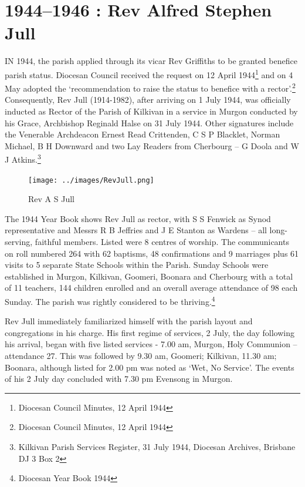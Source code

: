 \printendnotes[custom]
\setcounter{endnote}{0}
\chapter{1944--1946 : Rev Alfred Stephen Jull}
\nobalance


\lettrine[lines=3]{I}{N}
 1944, the parish applied through its vicar Rev Griffiths to be granted benefice parish status. Diocesan Council received the request on 12 April 1944\footnote{Diocesan Council Minutes, 12 April 1944} and on 4 May adopted the `recommendation to raise the status to benefice with a rector'.\footnote{Diocesan Council Minutes, 12 April 1944} Consequently, Rev Jull (1914-1982), after arriving on 1 July 1944, was officially inducted as Rector of the Parish of Kilkivan in a service in Murgon conducted by his Grace, Archbishop Reginald Halse on 31 July 1944. Other signatures include the Venerable Archdeacon Ernest Read Crittenden, C S P Blacklet, Norman Michael, B H Downward and two Lay Readers from Cherbourg -- G Doola and W J Atkins.\footnote{Kilkivan Parish Services Register, 31 July 1944, Diocesan Archives, Brisbane DJ 3 Box 2}







\begin{figure}
\begin{center}
\texttt{[image: ../images/RevJull.png]}
\caption{Rev A S Jull}
\end{center}
\end{figure}




The 1944 Year Book shows Rev Jull as rector, with S S Fenwick as Synod representative and Messrs R B Jeffries and J E Stanton as Wardens -- all long-serving, faithful members. Listed were 8 centres of worship. The communicants on roll numbered 264 with 62 baptisms, 48 confirmations and 9 marriages plus 61 visits to 5 separate State Schools within the Parish. Sunday Schools were established in Murgon, Kilkivan, Goomeri, Boonara and Cherbourg with a total of 11 teachers, 144 children enrolled and an overall average attendance of 98 each Sunday. The parish was rightly considered to be thriving.\footnote{Diocesan Year Book 1944}


Rev Jull immediately familiarized himself with the parish layout and congregations in his charge. His first regime of services, 2 July, the day following his arrival, began with five listed services - 7.00 am, Murgon, Holy Communion -- attendance 27. This was followed by 9.30 am, Goomeri; Kilkivan, 11.30 am; Boonara, although listed for 2.00 pm was noted as `Wet, No Service'. The events of his 2 July day concluded with 7.30 pm Evensong in Murgon.



